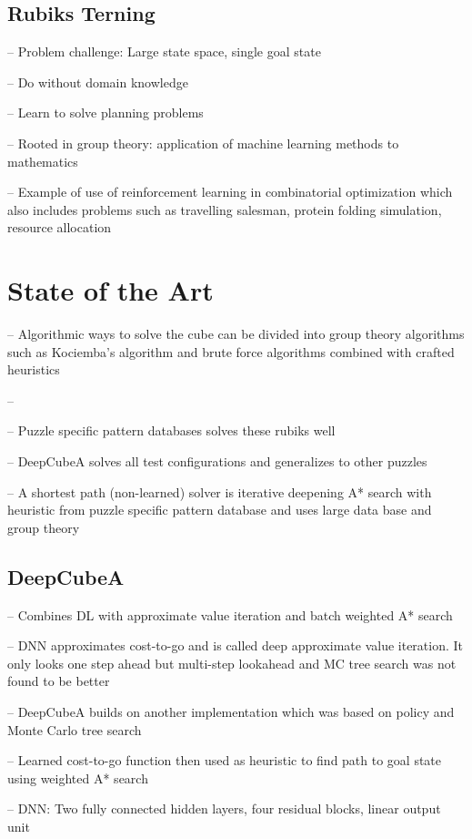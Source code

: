 \documentclass[../main.tex]{subfiles}
\begin{document}
\subsection{Rubiks Terning}

\cite{SolvingNature}



-- Problem challenge: Large state space, single goal state 

-- Do without domain knowledge

-- Learn to solve planning problems

-- Rooted in group theory: application of machine learning methods to mathematics

\cite{RubiksMedium}
-- Example of use of reinforcement learning in combinatorial optimization which also includes problems such as travelling salesman, protein folding simulation, resource allocation

\section{State of the Art}
\cite{RubiksMedium}

-- Algorithmic ways to solve the cube can be divided into group theory algorithms such as Kociemba's algorithm and brute force algorithms combined with crafted heuristics

--



\cite{SolvingNature}
-- Puzzle specific pattern databases solves these rubiks well


-- DeepCubeA solves all test configurations and generalizes to other puzzles

-- A shortest path (non-learned) solver is iterative deepening A* search with heuristic from puzzle specific pattern database and uses large data base and group theory 

\subsection{DeepCubeA}
\cite{SolvingNature}
-- Combines DL with approximate value iteration and batch weighted A* search

-- DNN approximates cost-to-go and is called deep approximate value iteration. It only looks one step ahead but multi-step lookahead  and MC tree search was not found to be better

-- DeepCubeA builds on another implementation which was based on policy and Monte Carlo tree search 

-- Learned cost-to-go function then used as heuristic to find path to goal state using weighted A* search

-- DNN: Two fully connected hidden layers, four residual blocks, linear output unit
\end{document}
